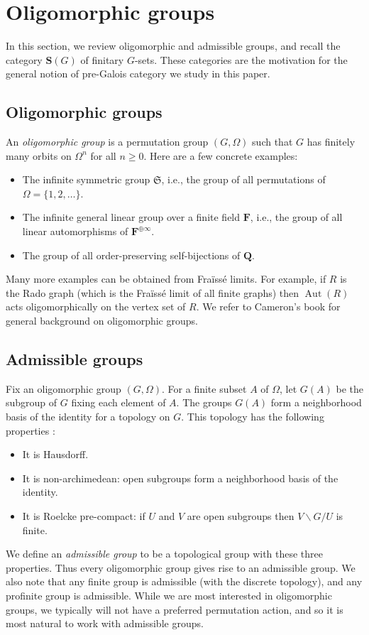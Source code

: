 \documentclass[12pt]{amsart}
\numberwithin{equation}{section}
\theoremstyle{definition}
\newcommand{\bF}{\mathbf{F}}
\newcommand{\bQ}{\mathbf{Q}}
\newcommand{\bS}{\mathbf{S}}
\newcommand{\fS}{\mathfrak{S}}
\newcommand{\defn}[1]{\emph{#1}}
\DeclareMathOperator{\Aut}{Aut}
\begin{document}
\section{Oligomorphic groups} \label{s:olig}

In this section, we review oligomorphic and admissible groups, and recall the category $\bS(G)$ of finitary $G$-sets. These categories are the motivation for the general notion of pre-Galois category we study in this paper.

\subsection{Oligomorphic groups}

An \defn{oligomorphic group} is a permutation group $(G, \Omega)$ such that $G$ has finitely many orbits on $\Omega^n$ for all $n \ge 0$. Here are a few concrete examples:
\begin{itemize}
\item The infinite symmetric group $\fS$, i.e., the group of all permutations of $\Omega=\{1,2,\ldots\}$.
\item The infinite general linear group over a finite field $\bF$, i.e., the group of all linear automorphisms of $\bF^{\oplus \infty}$.
\item The group of all order-preserving self-bijections of $\bQ$.
\end{itemize}
Many more examples can be obtained from Fra\"iss\'e limits. For example, if $R$ is the Rado graph (which is the Fra\"iss\'e limit of all finite graphs) then $\Aut(R)$ acts oligomorphically on the vertex set of $R$. We refer to Cameron's book \cite{CameronBook} for general background on oligomorphic groups.

\subsection{Admissible groups}

Fix an oligomorphic group $(G, \Omega)$. For a finite subset $A$ of $\Omega$, let $G(A)$ be the subgroup of $G$ fixing each element of $A$. The groups $G(A)$ form a neighborhood basis of the identity for a topology on $G$. This topology has the following properties \cite[\S 2.2]{repst}:
\begin{itemize}
\item It is Hausdorff.
\item It is non-archimedean: open subgroups form a neighborhood basis of the identity.
\item It is Roelcke pre-compact: if $U$ and $V$ are open subgroups then $V \backslash G/U$ is finite.
\end{itemize}
We define an \defn{admissible group} to be a topological group with these three properties. Thus every oligomorphic group gives rise to an admissible group. We also note that any finite group is admissible (with the discrete topology), and any profinite group is admissible. While we are most interested in oligomorphic groups, we typically will not have a preferred permutation action, and so it is most natural to work with admissible groups.
\end{document}
